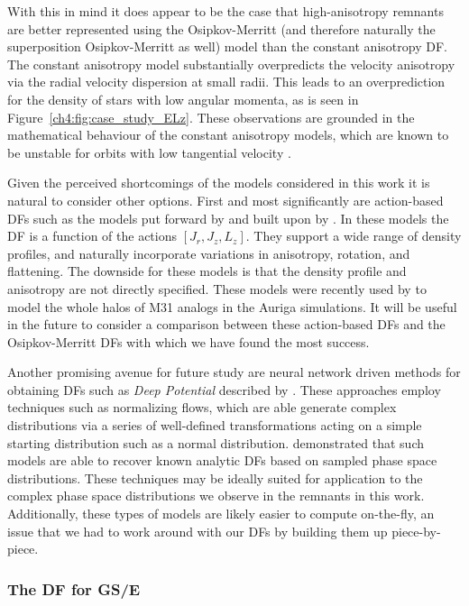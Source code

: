 With this in mind it does appear to be the case that high-anisotropy remnants are better represented using the Osipkov-Merritt (and therefore naturally the superposition Osipkov-Merritt as well) model than the constant anisotropy DF. The constant anisotropy model substantially overpredicts the velocity anisotropy via the radial velocity dispersion at small radii. This leads to an overprediction for the density of stars with low angular momenta, as is seen in Figure~\ref{ch4:fig:case_study_ELz}. These observations are grounded in the mathematical behaviour of the constant anisotropy models, which are known to be unstable for orbits with low tangential velocity \parencite{binney14d}.

Given the perceived shortcomings of the models considered in this work it is natural to consider other options. First and most significantly are action-based DFs such as the models put forward by \textcite{binney14d} and built upon by \textcite{posti15}. In these models the DF is a function of the actions $[J_{r},J_{z},L_{z}]$. They support a wide range of density profiles, and naturally incorporate variations in anisotropy, rotation, and flattening. The downside for these models is that the density profile and anisotropy are not directly specified. These models were recently used by \textcite{gherghinescu23} to model the whole halos of M31 analogs in the Auriga simulations. It will be useful in the future to consider a comparison between these action-based DFs and the Osipkov-Merritt DFs with which we have found the most success.

Another promising avenue for future study are neural network driven methods for obtaining DFs such as \textit{Deep Potential} described by \textcite{green23}. These approaches employ techniques such as normalizing flows, which are able generate complex distributions via a series of well-defined transformations acting on a simple starting distribution such as a normal distribution. \textcite{green23} demonstrated that such models are able to recover known analytic DFs based on sampled phase space distributions. These techniques may be ideally suited for application to the complex phase space distributions we observe in the remnants in this work. Additionally, these types of models are likely easier to compute on-the-fly, an issue that we had to work around with our DFs by building them up piece-by-piece.

\subsubsection{The DF for GS/E}

